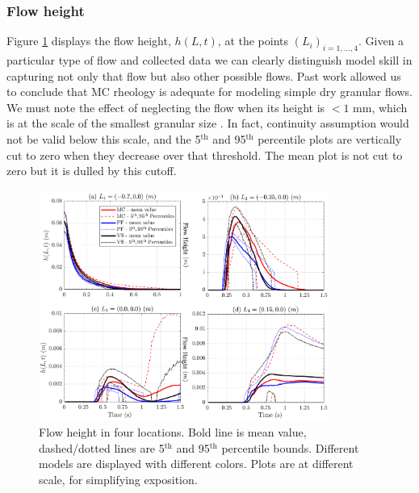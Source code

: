 \documentclass{article}
\begin{document}
\subsubsection{Flow height}
Figure \ref{fig:Ramp-H} displays the flow height, $h(L,t)$, at the points $(L_i)_{i=1,\dots,4}$. Given a particular type of flow and collected data we can clearly distinguish model skill in capturing not only that flow but also other possible flows. Past work \citep{Webb2004} allowed us to conclude that MC rheology is adequate for modeling simple dry granular flows. We must note the effect of neglecting the flow when its height is $<1$ mm, which is at the scale of the smallest granular size \citep{Aghakhani2016}. In fact, continuity assumption would not be valid below this scale, and the 5$^{\mathrm{th}}$ and 95$^{\mathrm{th}}$ percentile plots are vertically cut to zero when they decrease over that threshold. The mean plot is not cut to zero but it is dulled by this cutoff.
\begin{figure}[H]
         \centering
        \includegraphics[width=0.85\textwidth]{figures/incline/Height.png}
        \caption{Flow height in four locations. Bold line is mean value, dashed/dotted lines are 5$^{\mathrm{th}}$ and 95$^{\mathrm{th}}$ percentile bounds. Different models are displayed with different colors. Plots are at different scale, for simplifying exposition.}
        \label{fig:Ramp-H}
\end{figure}
\end{document}
